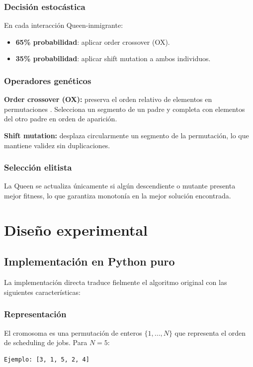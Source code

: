 \documentclass[12pt,a4paper]{article}
\begin{document}
\subsubsection{Decisión estocástica}

En cada interacción Queen-inmigrante:
\begin{itemize}
    \item \textbf{65\% probabilidad}: aplicar order crossover (OX).
    \item \textbf{35\% probabilidad}: aplicar shift mutation a ambos individuos.
\end{itemize}

\subsubsection{Operadores genéticos}

\textbf{Order crossover (OX):} preserva el orden relativo de elementos en permutaciones \cite{davis1985applying}. Selecciona un segmento de un padre y completa con elementos del otro padre en orden de aparición.

\textbf{Shift mutation:} desplaza circularmente un segmento de la permutación, lo que mantiene validez sin duplicaciones.

\subsubsection{Selección elitista}

La Queen se actualiza únicamente si algún descendiente o mutante presenta mejor fitness, lo que garantiza monotonía en la mejor solución encontrada.

\section{Diseño experimental}

\subsection{Implementación en Python puro}

La implementación directa traduce fielmente el algoritmo original con las siguientes características:

\subsubsection{Representación}

El cromosoma es una permutación de enteros $\{1, \ldots, N\}$ que representa el orden de scheduling de jobs. Para $N=5$:
\begin{verbatim}
Ejemplo: [3, 1, 5, 2, 4]
\end{verbatim}
\end{document}

